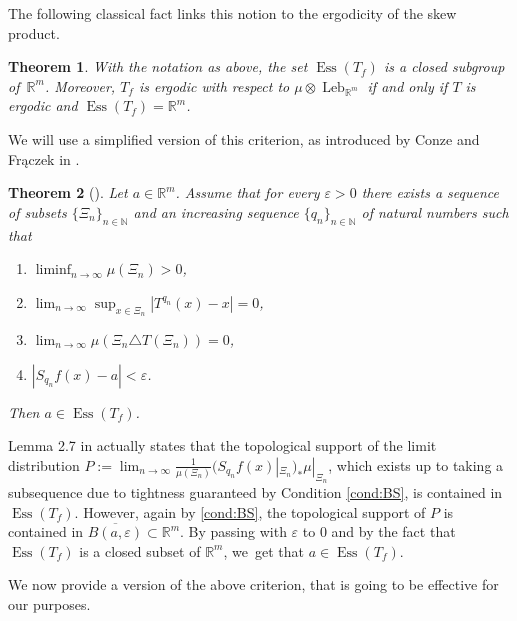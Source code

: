 \documentclass[JEP,XML,SOM,Unicode,NoEqCountersInSection,NoFloatCountersInSection,published]{cedram}
\let\epsilon\varepsilon
\DeclareMathOperator{\Ess}{Ess}
\DeclareMathOperator{\Leb}{Leb}
\theoremstyle{plain}
\newtheorem{theorem}{Theorem}[section]
\theoremstyle{definition}
\newcommand{\N}{\mathbb{N}}
\newcommand{\R}{\mathbb{R}}
\begin{document}
The following classical fact links this notion to the ergodicity of the skew product.
\begin{theorem}\label{thm: essvalues}
With the notation as above, the set $\Ess(T_f)$ is a closed subgroup of~$\R^m$. Moreover, $T_f$ is ergodic with respect to $\mu\otimes \Leb_{\R^m}$ if and only if $T$ is ergodic and $\Ess(T_f)=\R^m$.
\end{theorem}
We will use a simplified version of this criterion, as introduced by Conze and Frączek in
\cite{conze_cocycles_2011}.

\begin{theorem}[{\cite[Lem.\,2.7]{conze_cocycles_2011}}]\label{thm: FUcriterion}
Let $a\in\R^m$. Assume that for every $\epsilon>0$ there exists a sequence
of subsets $\{\Xi_n\}_{n\in\N}$ and an increasing sequence
$\{q_n\}_{n\in\N}$ of natural numbers such that
\begin{enumerate}
\item \label{cond:measure} $\liminf_{n\to\infty}\mu(\Xi_n)>0$,
\item \label{cond:rigidity}$\lim_{n\to\infty}\sup_{x\in \Xi_n}|T^{q_n}(x)-x|=0$,
\item \label{cond:almost_invariant} $\lim_{n\to\infty}\mu(\Xi_n\triangle T(\Xi_n))=0$,
\item \label{cond:BS} $|S_{q_n}f(x)-a|<\epsilon$.
\end{enumerate}
Then $a\in \Ess(T_f)$.
\end{theorem}

Lemma 2.7 in \cite{conze_cocycles_2011} actually states that
the
topological support of the limit distribution
$P:=\lim_{n\to\infty}\frac{1}{\mu(\Xi_n)}(S_{q_n}f(x)|_{\Xi_n})_*\mu|_{\Xi_n}$,
which exists up
to taking a subsequence due to tightness guaranteed by Condition
\eqref{cond:BS}, is contained in $\Ess(T_f)$. However, again by \eqref{cond:BS},
the topological support of $P$ is contained in $\overline{B(a,\epsilon)}\subset \R^m$. By
passing with $\epsilon$ to 0 and by the fact that $\Ess(T_f)$ is a closed subset
of $\R^m$, we~get that $a\in \Ess(T_f)$.

We now provide a version of the above criterion, that is going to be effective for our purposes.
\end{document}
